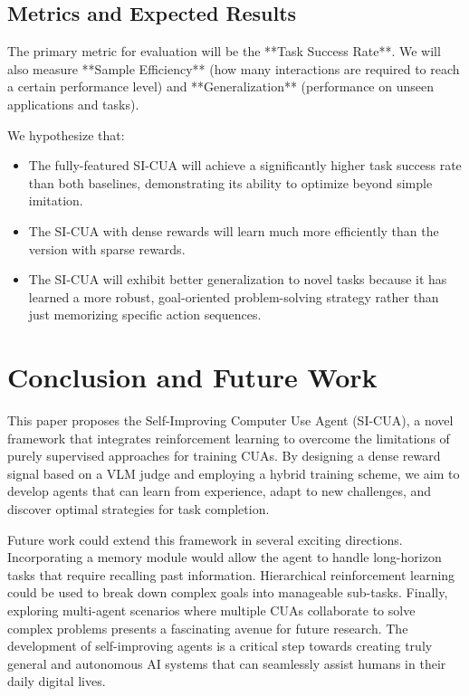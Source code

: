 \documentclass{article}
\begin{document}
\subsection{Metrics and Expected Results}
The primary metric for evaluation will be the **Task Success Rate**. We will also measure **Sample Efficiency** (how many interactions are required to reach a certain performance level) and **Generalization** (performance on unseen applications and tasks).

We hypothesize that:
\begin{itemize}
    \item The fully-featured SI-CUA will achieve a significantly higher task success rate than both baselines, demonstrating its ability to optimize beyond simple imitation.
    \item The SI-CUA with dense rewards will learn much more efficiently than the version with sparse rewards.
    \item The SI-CUA will exhibit better generalization to novel tasks because it has learned a more robust, goal-oriented problem-solving strategy rather than just memorizing specific action sequences.
\end{itemize}

\section{Conclusion and Future Work}
This paper proposes the Self-Improving Computer Use Agent (SI-CUA), a novel framework that integrates reinforcement learning to overcome the limitations of purely supervised approaches for training CUAs. By designing a dense reward signal based on a VLM judge and employing a hybrid training scheme, we aim to develop agents that can learn from experience, adapt to new challenges, and discover optimal strategies for task completion.

Future work could extend this framework in several exciting directions. Incorporating a memory module would allow the agent to handle long-horizon tasks that require recalling past information. Hierarchical reinforcement learning could be used to break down complex goals into manageable sub-tasks. Finally, exploring multi-agent scenarios where multiple CUAs collaborate to solve complex problems presents a fascinating avenue for future research. The development of self-improving agents is a critical step towards creating truly general and autonomous AI systems that can seamlessly assist humans in their daily digital lives.
\end{document}
